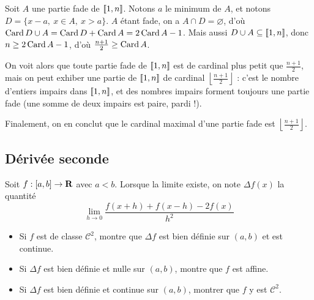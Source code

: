 \begin{correction}
    Soit $A$ une partie fade de $[\![1,n]\!]$. 
    Notons $a$ le minimum de $A$, et notons $D=\lbrace x-a,\ x\in A,\ x>a\rbrace$. 
    $A$ étant fade, on a $A\cap D=\varnothing$, d'où $\operatorname{Card} D\cup A=\operatorname{Card} D+\operatorname{Card} A=2\operatorname{Card} A-1$.
    Mais aussi $D\cup A\subseteq [\![1,n]\!]$, donc $n\geq 2\operatorname{Card} A-1$, d'où $\frac{n+1}2\geq \operatorname{Card} A$. 

    On voit alors que toute partie fade de $[\![1,n]\!]$ est de cardinal plus petit que $\frac{n+1}2$, mais on peut exhiber 
    une partie de $[\![1,n]\!]$ de cardinal $\left\lfloor\frac{n+1}2\right\rfloor$ : c'est le nombre d'entiers impairs dans $[\![1,n]\!]$,
    et des nombres impairs forment toujours une partie fade (une somme de deux impairs est paire, pardi !).

    Finalement, on en conclut que le cardinal maximal d'une partie fade est $\left\lfloor\frac{n+1}2\right\rfloor$.

\end{correction}

\subsection{Dérivée seconde}
\begin{exercice}
    Soit $f:[a,b]\to\operatorname{\mathbf{R}}$ avec $a<b$. Lorsque la limite existe, on note $\Delta f(x)$ la quantité 
    \[
        \lim_{h\to 0}\frac{f(x+h)+f(x-h)-2f(x)}{h^2}
    \]
    \begin{itemize}
        \item Si $f$ est de classe $\mathcal C^2$, montre que $\Delta f$ est bien définie sur $(a,b)$ et est continue.
        \item Si $\Delta f$ est bien définie et nulle sur $(a,b)$, montre que $f$ est affine.
        \item Si $\Delta f$ est bien définie et continue sur $(a,b)$, montrer que $f$ y est $\mathcal C^2$. 
    \end{itemize}
\end{exercice}

\begin{correction}[À rédiger]
    
\end{correction}